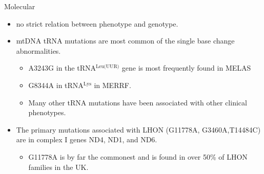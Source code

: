 \documentclass[presentation, smaller]{beamer}
\begin{document}
\begin{frame}[label={sec:orgaeaf1fb}]{Molecular}
\begin{itemize}
\item no strict relation between phenotype and genotype.
\item mtDNA tRNA mutations are most common of the single base change abnormalities.
\begin{itemize}
\item A3243G in the tRNA\(^{\text{Leu(UUR)}}\) gene is most frequently found in MELAS
\item G8344A in tRNA\(^{\text{Lys}}\) in MERRF.
\item Many other tRNA mutations have been associated with other clinical phenotypes.
\end{itemize}
\item The primary mutations associated with LHON (G11778A, G3460A,T14484C) are in complex I genes ND4, ND1, and ND6.
\begin{itemize}
\item G11778A is by far the commonest and is found in over 50\% of LHON families in the UK.
\end{itemize}
\end{itemize}
\end{frame}
\end{document}
